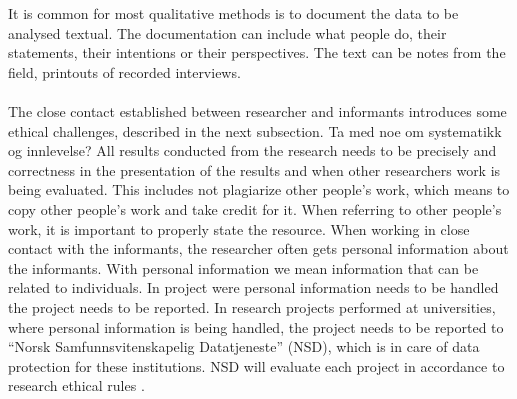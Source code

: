 It is common for most qualitative methods is to document the data to be analysed textual. The documentation can include what people do, their statements, their intentions or their perspectives. The text can be notes from the field, printouts of  recorded interviews. \\ \\
The close contact established between researcher and informants introduces some ethical  challenges, described in the next subsection. Ta med noe om systematikk og innlevelse? All results conducted from the research needs to be precisely and correctness in the presentation of the results and when other researchers work is being evaluated. This includes not plagiarize other people's work, which means to copy other people’s work and take credit for it. When referring to other people’s work, it is important to properly state the resource. When working in close contact with the informants, the researcher often gets personal information about the informants. With personal information we mean information that can be related to individuals. In project were personal information needs to be handled the project needs to be reported. In research projects performed at universities, where personal information is being handled, the project needs to be reported to “Norsk Samfunnsvitenskapelig Datatjeneste” (NSD), which is in care of data protection for these institutions. NSD will evaluate each project in accordance to research ethical rules \cite{qualitative}. \\ \\
